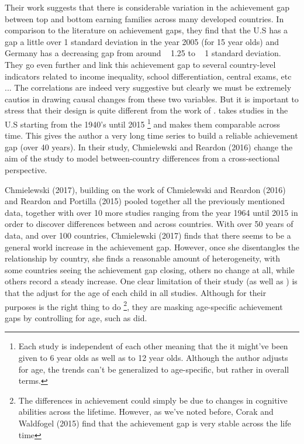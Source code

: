 \documentclass[11pt, a4paper]{article}\usepackage[]{graphicx}\usepackage[]{color}
\begin{document}
Their work suggests that there is considerable variation in the achievement gap between top and bottom earning families across many developed countries. In comparison to the literature on achievement gaps, they find that the U.S has a gap a little over 1 standard deviation in the year 2005 (for 15 year olds) and Germany has a decreasing gap from around ~ 1.25 to ~ 1 standard deviation. They go even further and link this achievement gap to several country-level indicators related to income inequality, school differentiation, central exams, etc ... The correlations are indeed very suggestive but clearly we must be extremely cautios in drawing causal changes from these two variables. But it is important to stress that their design is quite different from the work of \citet{reardon2011}. \citet{reardon2011} takes studies in the U.S starting from the 1940's until 2015 \footnote{Each study is independent of each other meaning that the it might've been given to 6 year olds as well as to 12 year olds. Although the author adjusts for age, the trends can't be generalized to age-specific, but rather in overall terms.} and makes them comparable across time. This gives the author a very long time series to build a reliable achievement gap (over 40 years). In their study, Chmielewski and Reardon (2016) change the aim of the study to model between-country differences from a cross-sectional perspective.

Chmielewski (2017), building on the work of Chmielewski and Reardon (2016) and Reardon and Portilla (2015) pooled together all the previously mentioned data, together with over 10 more studies ranging from the year 1964 until 2015 in order to discover differences between and across countries. With over 50 years of data, and over 100 countries, Chmielewski (2017) finds that there seems to be a general world increase in the achievement gap. However, once she disentangles the relationship by country, she finds a reasonable amount of heterogeneity, with some countries seeing the achievement gap closing, others no change at all, while others record a steady increase. One clear limitation of their study (as well as \citet{reardon2011}) is that the adjust for the age of each child in all studies. Although for their purposes is the right thing to do \footnote{The differences in achievement could simply be due to changes in cognitive abilities across the lifetime. However, as we've noted before, Corak and Waldfogel (2015) find that the achievement gap is very stable across the life time}, they are masking age-specific achievement gaps by controlling for age, such as \citet{reardon2011} did.
\end{document}
